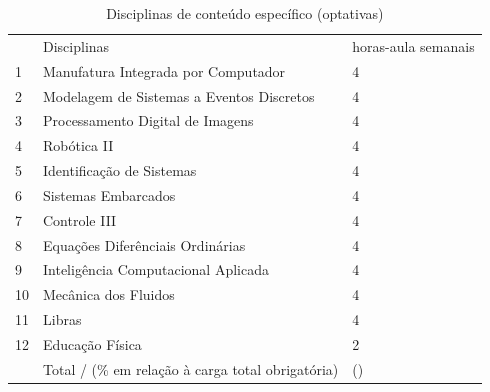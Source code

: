 \begin{destacar}
\begin{longtable}{|p{0.8cm}|p{7.5cm}|p{2.0cm}|}
	\caption{Disciplinas de conteúdo específico (optativas)}\label{tab7} 
	\vspace{-0.25cm}
	\\ \hline 
	\cellcolor{\cinza} & \cellcolor{\cinza}Disciplinas & \cellcolor{\cinza}horas-aula semanais  \\ 
	\hline
	1 &  Manufatura Integrada por Computador  &  4 \\ \hline
	2 &  Modelagem de Sistemas a Eventos Discretos  &  4 \\ \hline
	3 &  Processamento Digital de Imagens  &  4 \\ \hline
	4 &  Robótica II  &  4 \\ \hline
	5 &  Identificação de Sistemas  &  4 \\ \hline
	6 &  Sistemas Embarcados  &  4 \\ \hline
	7 &  Controle III  &  4 \\ \hline
	8 &  Equações Diferênciais Ordinárias  &  4 \\ \hline
	9 &  Inteligência Computacional Aplicada  &  4 \\ \hline
	10 &  Mecânica dos Fluidos  &  4 \\ \hline
	11 &  Libras  &  4 \\ \hline
	12 &  Educação Física  &  2 \\ \hline
	&  Total / (\% em relação à carga total obrigatória)  &  \CHOPTCR(\CHOPTPEMIN) \\ \hline
\end{longtable}


\end{destacar}

